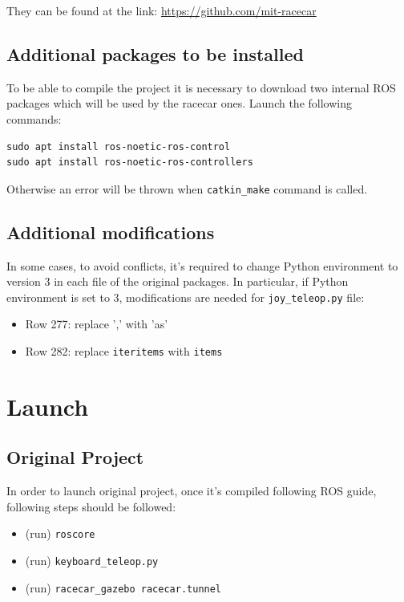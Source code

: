 \documentclass[12pt, letterpaper]{report}
\begin{document}
They can be found at the link: \url{https://github.com/mit-racecar}

\subsection{Additional packages to be installed}

To be able to compile the project it is necessary to download two internal ROS packages which will be used by the racecar ones. Launch the following commands:

\begin{verbatim}
sudo apt install ros-noetic-ros-control
sudo apt install ros-noetic-ros-controllers
\end{verbatim}

\noindent Otherwise an error will be thrown when \verb|catkin_make| command is called.

\subsection{Additional modifications}

In some cases, to avoid conflicts, it's required to change Python environment to version 3 in each file of the original packages.
In particular, if Python environment is set to 3, modifications are needed for \verb|joy_teleop.py| file:

\begin{itemize}
	\item Row 277: replace ',' with 'as'
	\item Row 282: replace \verb|iteritems| with \verb|items|
\end{itemize}

\section{Launch}

\subsection{Original Project}

In order to launch original project, once it's compiled following ROS guide, following steps should be followed:

\begin{itemize}
	\item (run) \verb|roscore|
	\item (run) \verb|keyboard_teleop.py|
	\item (run) \verb|racecar_gazebo racecar.tunnel|
\end{itemize}
\end{document}

